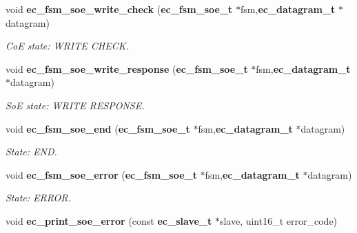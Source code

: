 \begin{DoxyCompactItemize}
void {\bf ec\-\_\-fsm\-\_\-soe\-\_\-write\-\_\-check} ({\bf ec\-\_\-fsm\-\_\-soe\-\_\-t} $\ast$fsm,{\bf ec\-\_\-datagram\-\_\-t} $\ast$datagram)
\begin{DoxyCompactList}\small\item\em \-Co\-E state\-: \-W\-R\-I\-T\-E \-C\-H\-E\-C\-K. \end{DoxyCompactList}\item 
void {\bf ec\-\_\-fsm\-\_\-soe\-\_\-write\-\_\-response} ({\bf ec\-\_\-fsm\-\_\-soe\-\_\-t} $\ast$fsm,{\bf ec\-\_\-datagram\-\_\-t} $\ast$datagram)
\begin{DoxyCompactList}\small\item\em \-So\-E state\-: \-W\-R\-I\-T\-E \-R\-E\-S\-P\-O\-N\-S\-E. \end{DoxyCompactList}\item 
void {\bf ec\-\_\-fsm\-\_\-soe\-\_\-end} ({\bf ec\-\_\-fsm\-\_\-soe\-\_\-t} $\ast$fsm,{\bf ec\-\_\-datagram\-\_\-t} $\ast$datagram)
\begin{DoxyCompactList}\small\item\em \-State\-: \-E\-N\-D. \end{DoxyCompactList}\item 
void {\bf ec\-\_\-fsm\-\_\-soe\-\_\-error} ({\bf ec\-\_\-fsm\-\_\-soe\-\_\-t} $\ast$fsm,{\bf ec\-\_\-datagram\-\_\-t} $\ast$datagram)
\begin{DoxyCompactList}\small\item\em \-State\-: \-E\-R\-R\-O\-R. \end{DoxyCompactList}\item 
void {\bf ec\-\_\-print\-\_\-soe\-\_\-error} (const {\bf ec\-\_\-slave\-\_\-t} $\ast$slave, uint16\-\_\-t error\-\_\-code)\label{fsm__soe_8c_aac6e087c335a755f1ce0ada566734be4}


\end{DoxyCompactItemize}
